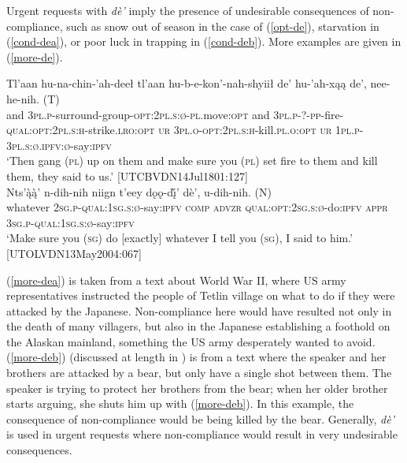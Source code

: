 \documentclass[output=paper,colorlinks,citecolor=brown]{langscibook}
\begin{document}
Urgent requests with \textit{dè'} imply the presence of undesirable consequences of non-compliance, such as snow out of season in the case of (\ref{opt-de}), starvation in (\ref{cond-dea}), or poor luck in trapping in (\ref{cond-deb}). More examples are given in (\ref{more-de}). 

\begin{exe}
\ex \label{more-de}
\begin{xlista}
\ex\label{more-dea}
\gll Tl'aan hu-na-chin-'ah-deeł tl'aan hu-b-e-kon'-nah-shyiił de' hu-'ah-xąą de', {nee-he-nih. \textnormal{(T)}} \\
and \textsc{3pl.p}-surround-group-\textsc{opt:2pl.s:ø-pl}.move:\textsc{opt} and \textsc{3pl.p-?-pp}-fire-\textsc{qual:opt:2pl.s:h}-strike.\textsc{lro:opt} \textsc{ur} \textsc{3pl.o-opt:2pl.s:h}-kill.\textsc{pl.o:opt} \textsc{ur} \textsc{1pl.p-3pl.s:ø.ipfv:ø}-say:\textsc{ipfv}\\
\glt `Then gang (\textsc{pl}) up on them and make sure you (\textsc{pl}) set fire to them and kill them, they said to us.' \hfill [UTCBVDN14Jul1801:127] \\
\ex\label{more-deb}
\gll Nts'ą̀ą̀' n-dih-nih niign t'eey dǫǫ-dį̀' dè', {u-dih-nih. \textnormal{(N)}}\\
whatever \textsc{2sg.p-qual:1sg.s:ø}-say:\textsc{ipfv} \textsc{comp} \textsc{advzr} \textsc{qual:opt:2sg.s:ø}-do:\textsc{ipfv} \textsc{appr} \textsc{3sg.p-qual:1sg.s:ø}-say:\textsc{ipfv} \\
\glt `Make sure you (\textsc{sg}) do [exactly] whatever I tell you (\textsc{sg}), I said to him.' \hfill [UTOLVDN13May2004:067]
\end{xlista}
\end{exe}

\noindent (\ref{more-dea}) is taken from a text about World War II, where US army representatives instructed the people of Tetlin village on what to do if they were attacked by the Japanese. Non-compliance here would have resulted not only in the death of many villagers, but also in the Japanese establishing a foothold on the Alaskan mainland, something the US army desperately wanted to avoid. (\ref{more-deb}) (discussed at length in \citealt{LovickO2016}) is from a text where the speaker and her brothers are attacked by a bear, but only have a single shot between them. The speaker is trying to protect her brothers from the bear; when her older brother starts arguing, she shuts him up with (\ref{more-deb}). In this example, the consequence of non-compliance would be being killed by the bear. Generally, \textit{dè'} is used in urgent requests where non-compliance would result in very undesirable consequences.
\end{document}
